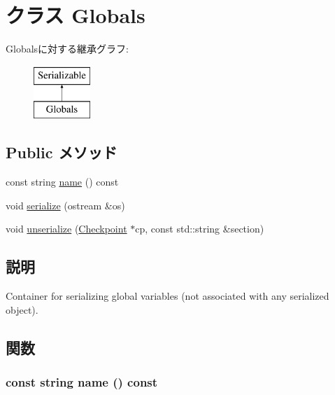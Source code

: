 \hypertarget{classGlobals}{
\section{クラス Globals}
\label{classGlobals}
}
Globalsに対する継承グラフ:\begin{figure}[H]
\begin{center}
\leavevmode
\includegraphics[height=2cm]{classGlobals}
\end{center}
\end{figure}
\subsection*{Public メソッド}
\begin{DoxyCompactItemize}
\item 
const string \hyperlink{classGlobals_a9ad420f063400c6f6e81455a7c1b6180}{name} () const 
\item 
void \hyperlink{classGlobals_a21e39b74fa4d4676016935883b644bc4}{serialize} (ostream \&os)
\item 
void \hyperlink{classGlobals_af22e5d6d660b97db37003ac61ac4ee49}{unserialize} (\hyperlink{classCheckpoint}{Checkpoint} $\ast$cp, const std::string \&section)
\end{DoxyCompactItemize}


\subsection{説明}
Container for serializing global variables (not associated with any serialized object). 

\subsection{関数}
\hypertarget{classGlobals_a9ad420f063400c6f6e81455a7c1b6180}{
\subsubsection[{name}]{\setlength{\rightskip}{0pt plus 5cm}const string name () const}}
\label{classGlobals_a9ad420f063400c6f6e81455a7c1b6180}



